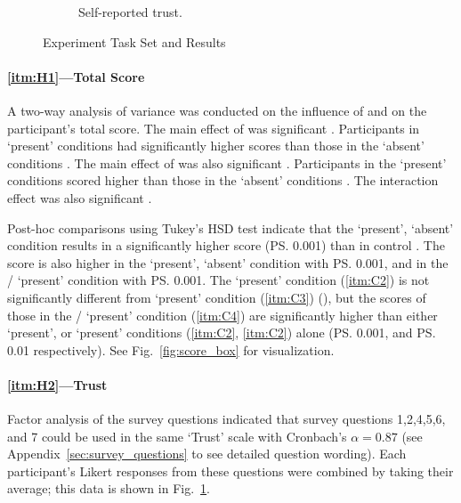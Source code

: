 \begin{figure}[tbp]
\begin{subfigure}[b]{0.30\linewidth}
        \caption{Self-reported trust.}
        \label{fig:trust_box}
    \end{subfigure} 
    \caption{Experiment Task Set and Results}
    \label{fig:taskset_results}
    \vspace{-0.5cm}
\end{figure}
\paragraph{\ref{itm:H1}---Total Score}
A two-way analysis of variance was conducted on the influence of \xQ{} and \xO{} on the participant's total score. The main effect of \xQ{} was significant . Participants in \xQ{} `present' conditions had significantly higher scores  than those in the \xQ{} `absent' conditions . The main effect of \xO{} was also significant . Participants in the \xO{} `present' conditions scored higher  than those in the \xO{} `absent' conditions . The interaction effect was also significant .

Post-hoc comparisons using Tukey's HSD test indicate that the \xQ{} `present', \xO{} `absent' condition  results in a significantly higher score (\ps{0.001}) than in control . The score is also higher  in the \xO{} `present', \xQ{} `absent' condition  with \ps{0.001}, and in the \xQ/\xO{} `present' condition  with \ps{0.001}. The \xQ{} `present' condition (\ref{itm:C2}) is not significantly different from \xO{} `present' condition (\ref{itm:C3}) (\pns), but the scores of those in the \xQ/\xO{} `present' condition (\ref{itm:C4}) are significantly higher than either \xQ{} `present', or \xO{} `present' conditions (\ref{itm:C2}, \ref{itm:C2}) alone (\ps{0.001}, and \ps{0.01} respectively). See Fig.~\ref{fig:score_box} for visualization.

\paragraph{\ref{itm:H2}---Trust}
Factor analysis of the survey questions indicated that survey questions 1,2,4,5,6, and 7 could be used in the same `Trust' scale with Cronbach's $\alpha = 0.87$ (see Appendix~\ref{sec:survey_questions} to see detailed question wording). Each participant's Likert responses from these questions were combined by taking their average; this data is shown in Fig.~\ref{fig:trust_box}.

